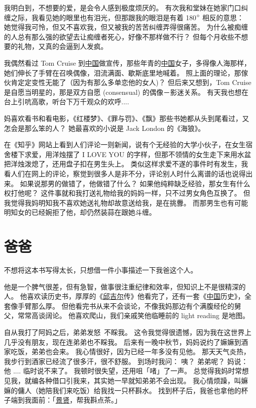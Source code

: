 \documentclass[12pt]{report}
\begin{document}
我明白到，不想要的爱，是会令人感到极度烦厌的。 有次我和堂妹在她家门口纠缠之际，我看见她的眼里也有泪光，但那跟我的眼泪是有着 180$\degree$ 相反的意思： 她觉得我可怜，但又不喜欢我，但又被我的苦苦纠缠弄得很痛苦。 为什么被痴缠的人总有那么强的欲望去让痴缠者死心，好像不那样做不行？ 但每个月收些不想要的礼物，又真的会逼到人发疯。

我偶然看过 Tom Cruise 到\uline{中国}做宣传，那些年青的\uline{中国}女子，多得像人海那样，她们伸长了手臂在召唤偶像，泪流满面、歇斯底里地喊着。 照上面的理论，那傢伙肯定定变性无能了（因为有那么多单恋他的女人)？ 但后来又想到，Tom Cruise 是自愿当明星的，那是双方自愿 (consensual) 的偶像－影迷关系。 有天我也想在台上引吭高歌，听台下万千观众的欢呼....

妈喜欢看书和看电影，《红楼梦》、《罪与罚》、《飘》那些书她都从头到尾看过，又怎会是那么笨的人？ 她最喜欢的小说是 Jack London 的《海狼》。

在《知乎》网站上看到人们评论一则新闻，说有个无经验的大学小伙子，在女生宿舍楼下求爱，用洋烛摆了 I LOVE YOU 的字样，但那不领情的女生走下来用水盆把洋烛泼熄了，还用盘子扣在男生头上。  类似这样求爱不遂的事件时有发生，我看人们在网上的评论，察觉到很多人是非不分，评论别人时什么离谱的话也说得出来。 如果说那男的做错了，他做错了什么？  如果他纯粹缺乏经验，那女生有什么权打他呢？  这件事就和我打送礼物给我的妈妈一样，只不过男女角色互换了。  但我觉得我妈明知我不喜欢她送礼物却故意送给我，是在挑釁。  而那男生也有可能明知女的已经婉拒了他，却仍然装蒜在跟她斗缠。


\chapter{爸爸}

不想将这本书写得太长，只想借一件小事描述一下我爸这个人。

他是一个脾气很差，但有急智，做事很注重纪律和效率，但知识上不是很精深的人。  他喜欢读历史书，厚厚的《\uline{邱吉尔}传》他看完了，还有一套《\uline{中国}历史》，全套像手臂那么厚。  但他看完书从来不会谈论，不像我妈那边有个满腹经伦的舅父，常常高谈阔论。 他喜欢爬山，我们亲戚笑他临睡前的 light reading 是地图。

自从我打了阿妈之后，弟弟发怒~不睬我。 这令我觉得很遗憾，因为我在这世界上几乎没有朋友，现在连弟弟也不睬我。 后来有一晚中秋节，妈妈说约了嫲嫲到酒家吃饭，弟弟也会来。  我心情很好，因为已经一年多没有见他。  那天天气炎热，我步行到酒家已经流了很多汗，很不舒服。 到场时我问： 咦？ 弟弟呢？ 妈说： 他 .... 临时说不来了。 我顿时很失望，还用咀「啫」了一声。  总觉得我妈时常想见我，就编各种借口引我来，其实她一早就知弟弟不会出现。 我心情烦躁，叫嫲嫲的傭人（她陪我们来吃饭）给我找一只杯斟水。 找到杯子后，我爸也拿他的杯子端到我面前：「\uline{景贤}，帮我斟点茶。」
\end{document}
